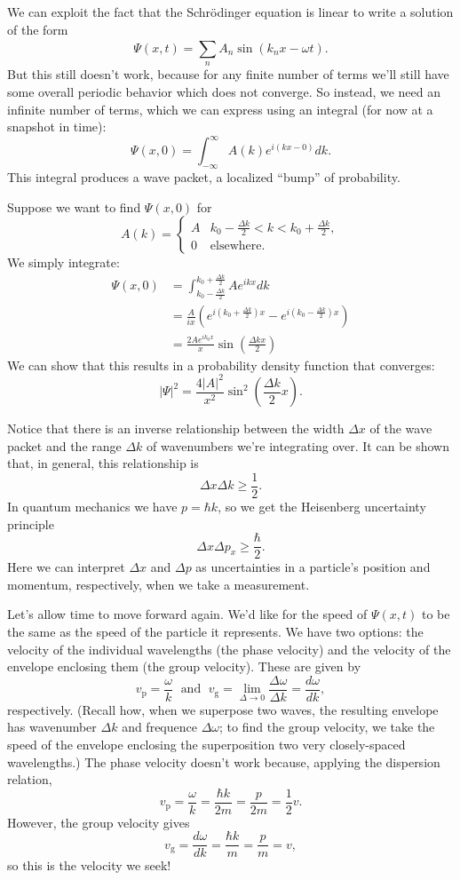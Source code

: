 \documentclass[../p052main.tex]{subfiles}
\begin{document}
We can exploit the fact that the Schrödinger equation is linear to write a solution of the form
\[ \Psi(x,t) = \sum_{n}^{} A_n \sin (k_n x - \omega t). \]
But this still doesn't work, because for any finite number of terms we'll still have some overall periodic behavior which does not converge.
So instead, we need an infinite number of terms, which we can express using an integral (for now at a snapshot in time):
\[ \Psi(x,0) = \int_{-\infty}^{\infty} A(k) e^{i(kx - 0)}dk. \]
This integral produces a wave packet, a localized ``bump'' of probability.

\begin{example}
    Suppose we want to find $\Psi(x,0)$ for
    \[ A(k) = \begin{cases} A & k_0 - \frac{\Delta k}{2} < k < k_0 + \frac{\Delta k}{2}, \\ 0 & \text{elsewhere}. \end{cases} \]
    We simply integrate:
    \begin{align*}
        \Psi(x,0) &= \int_{k_0 - \frac{\Delta k}{2}}^{k_0 + \frac{\Delta k}{2}} Ae^{ikx}dk \\
        &= \frac{A}{ix} \left( e^{i(k_0 + \frac{\Delta k}{2})x} - e^{i(k_0 - \frac{\Delta k}{2})x} \right) \\
        &= \frac{2Ae^{ik_0x}}{x} \sin\left( \frac{\Delta k x}{2} \right)
    \end{align*}
    We can show that this results in a probability density function that converges:
    \[ |\Psi|^2 = \frac{4|A|^2}{x^2} \sin^2 \left( \frac{\Delta k}{2}x \right). \]
\end{example}

Notice that there is an inverse relationship between the width $\Delta x$ of the wave packet and the range $\Delta k$ of wavenumbers we're integrating over.
It can be shown that, in general, this relationship is
\[ \Delta x \Delta k \geq \frac{1}{2}. \]
In quantum mechanics we have $p = \hbar k$, so we get the Heisenberg uncertainty principle
\[ \Delta x \Delta p_x \geq \frac{\hbar}{2}. \]
Here we can interpret $\Delta x$ and $\Delta p$ as uncertainties in a particle's position and momentum, respectively, when we take a measurement.

Let's allow time to move forward again.
We'd like for the speed of $\Psi(x,t)$ to be the same as the speed of the particle it represents.
We have two options: the velocity of the individual wavelengths (the phase velocity) and the velocity of the envelope enclosing them (the group velocity).
These are given by
\[ v_\textrm{p}= \frac{\omega}{k} \;\text{ and }\; v_\textrm{g} = \lim_{\Delta \to 0} \frac{\Delta \omega}{\Delta k} = \frac{d\omega}{dk}, \]
respectively.
(Recall how, when we superpose two waves, the resulting envelope has wavenumber $\Delta k$ and frequence $\Delta \omega$; to find the group velocity, we take the speed of the envelope enclosing the superposition two very closely-spaced wavelengths.)
The phase velocity doesn't work because, applying the dispersion relation,
\[ v_\textrm{p} = \frac{\omega}{k} = \frac{\hbar k}{2m} = \frac{p}{2m} = \frac{1}{2}v. \]
However, the group velocity gives
\[ v_\textrm{g} = \frac{d\omega}{dk} = \frac{\hbar k}{m} = \frac{p}{m} = v, \]
so this is the velocity we seek!
\end{document}
